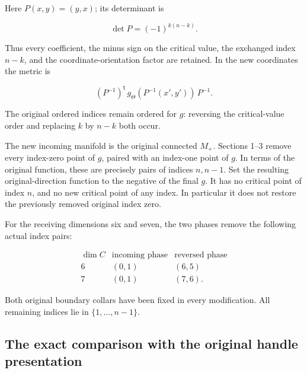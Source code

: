 Here \(P(x,y)=(y,x)\); its determinant is

\begin{equation}
\det P=(-1)^{k(n-k)}.
 \label{courseIII:removing-the-original-zero-and-top-handles:eq:4.5}
\end{equation}

Thus every coefficient, the minus sign on the critical value, the exchanged index \(n-k\), and the coordinate-orientation factor are retained. In the new coordinates the metric is

\begin{equation}
(P^{-1})^{\mathsf t}\,g_\Theta(P^{-1}(x',y'))\,P^{-1}.
 \label{courseIII:removing-the-original-zero-and-top-handles:eq:4.6}
\end{equation}

The original ordered indices remain ordered for \(g\): reversing the critical-value order and replacing \(k\) by \(n-k\) both occur.

The new incoming manifold is the original connected \(M_+\). Sections 1--3 remove every index-zero point of \(g\), paired with an index-one point of \(g\). In terms of the original function, these are precisely pairs of indices \(n,n-1\). Set the resulting original-direction function to the negative of the final \(g\). It has no critical point of index \(n\), and no new critical point of any index. In particular it does not restore the previously removed original index zero.

For the receiving dimensions six and seven, the two phases remove the following actual index pairs:

\begin{equation}
\begin{array}{c|c|c}
 \dim C&\text{incoming phase}&\text{reversed phase}\\ \hline
 6&(0,1)&(6,5)\\
 7&(0,1)&(7,6).
 \end{array}
 \label{courseIII:removing-the-original-zero-and-top-handles:eq:4.7}
\end{equation}

Both original boundary collars have been fixed in every modification. All remaining indices lie in \(\{1,\ldots,n-1\}\).

\subsection{The exact comparison with the original handle presentation}
\label{courseIII:removing-the-original-zero-and-top-handles:zero-presentation-comparison}

